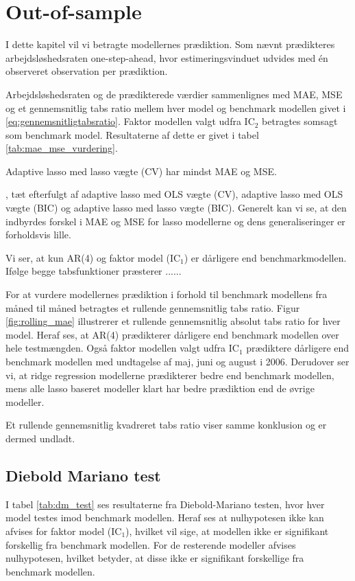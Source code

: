 \chapter{Out-of-sample} \label{ch:out-of-sample}
I dette kapitel vil vi betragte modellernes prædiktion.
Som nævnt prædikteres arbejdsløshedsraten one-step-ahead, hvor estimeringsvinduet udvides med én observeret observation per prædiktion.

Arbejdsløshedsraten og de prædikterede værdier sammenlignes med MAE, MSE og et gennemsnitlig tabs ratio mellem hver model og benchmark modellen givet i \eqref{eq:gennemsnitligtabsratio}.
Faktor modellen valgt udfra IC\(_2\) betragtes somsagt som benchmark model.
Resultaterne af dette er givet i tabel \ref{tab:mae_mse_vurdering}.



Adaptive lasso med lasso vægte (CV) har mindst MAE og MSE.

, tæt efterfulgt af adaptive lasso med OLS vægte (CV), adaptive lasso med OLS vægte (BIC) og adaptive lasso med lasso vægte (BIC). 
Generelt kan vi se, at den indbyrdes forskel i MAE og MSE for lasso modellerne og dens generaliseringer er forholdsvis lille.
 
Vi ser, at kun AR(4) og faktor model (IC$_1$) er dårligere end benchmarkmodellen. 
Ifølge begge tabsfunktioner præsterer  ......

For at vurdere modellernes prædiktion i forhold til benchmark modellens fra måned til måned betragtes et rullende gennemsnitlig tabs ratio.
Figur \ref{fig:rolling_mae} illustrerer et rullende gennemsnitlig absolut tabs ratio for hver model. 
Heraf ses, at AR(4) prædikterer dårligere end benchmark modellen over hele testmængden.
Også faktor modellen valgt udfra IC$_1$ prædiktere dårligere end benchmark modellen med undtagelse af maj, juni og august i 2006.
Derudover ser vi, at ridge regression modellerne prædikterer bedre end benchmark modellen, mens alle lasso baseret modeller klart har bedre prædiktion end de øvrige modeller.
%
%

Et rullende gennemsnitlig kvadreret tabs ratio viser samme konklusion og er dermed undladt.
%
%

\section{Diebold Mariano test}
I tabel \ref{tab:dm_test} ses resultaterne fra Diebold-Mariano testen, hvor hver model testes imod benchmark modellen.
Heraf ses at nulhypotesen ikke kan afvises for faktor model (IC\(_1\)), hvilket vil sige, at modellen ikke er signifikant forskellig fra benchmark modellen.
For de resterende modeller afvises nulhypotesen, hvilket betyder, at disse ikke er signifikant forskellige fra benchmark modellen.
%

%
\newpage
